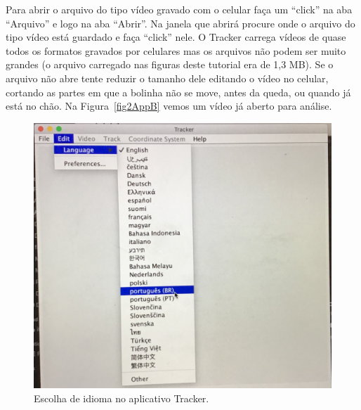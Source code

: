 Para abrir o arquivo do tipo vídeo  gravado com o celular faça um ``click'' na aba
``Arquivo'' e logo na aba ``Abrir''. Na janela que abrirá procure onde o arquivo   do tipo vídeo
está guardado e faça ``click'' nele. O Tracker carrega vídeos de quase todos os formatos gravados 
por celulares mas os arquivos não podem ser muito grandes (o arquivo carregado nas figuras 
deste tutorial era de 1,3 MB). Se o arquivo não abre tente reduzir o tamanho dele editando 
o vídeo no celular, cortando as partes em que a bolinha não se move, antes da queda, ou quando
já está no chão.
Na Figura~\ref{fig2AppB} vemos um vídeo já aberto para análise.
 \begin{minipage}{\linewidth}
      \centering
      \begin{minipage}{0.4\linewidth}
          \begin{figure}[H]
              \includegraphics[width=\linewidth]{Figuras_exp3/fig1AppB.pdf}
              \caption{\label{fig1AppB} Escolha de idioma no aplicativo Tracker.}
          \end{figure}
      \end{minipage}
      \hspace{0.01\linewidth}
      \begin{minipage}{0.4\linewidth}
          \begin{figure}[H]

\end{figure}
\end{minipage}
\end{minipage}
